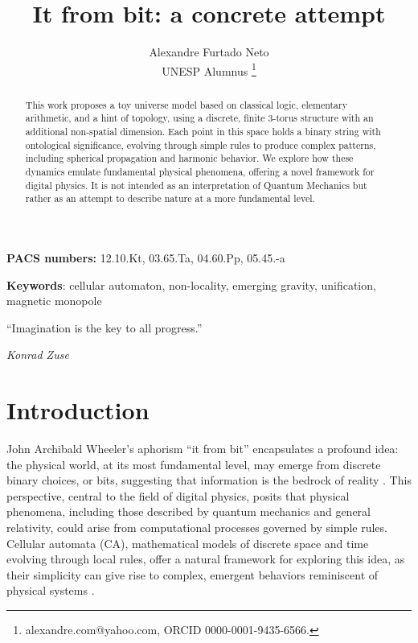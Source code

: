 \documentclass[12pt,english]{article}
\begin{document}
\title{It from bit: a concrete attempt}
\author{Alexandre Furtado Neto \\ UNESP Alumnus \thanks{alexandre.com@yahoo.com, ORCID 0000-0001-9435-6566.}}
\maketitle

\begin{abstract}
This work proposes a toy universe model based on classical logic, elementary arithmetic, and a hint of topology, using a discrete, finite 3-torus structure with an additional non-spatial dimension. Each point in this space holds a binary string with ontological significance, evolving through simple rules to produce complex patterns, including spherical propagation and harmonic behavior. We explore how these dynamics emulate fundamental physical phenomena, offering a novel framework for digital physics.  It is not intended as an interpretation of Quantum Mechanics but rather as an attempt to describe nature at a more fundamental level.

\medskip{}
\end{abstract}

\vfill

\begin{center}
\textbf{PACS numbers: }12.10.Kt, 03.65.Ta, 04.60.Pp, 05.45.-a
\par\end{center}

\begin{center}
\textbf{Keywords}: cellular automaton, non-locality, emerging gravity, unification, magnetic monopole
\par\end{center}

\newpage


\epigraph{``Imagination is the key to all progress.''}{\textit{Konrad Zuse}}

\section{Introduction}

John Archibald Wheeler's aphorism ``it from bit'' encapsulates a profound idea: the physical world, at its most fundamental level, may emerge from discrete binary choices, or bits, suggesting that information is the bedrock of reality \cite{wheeler}. This perspective, central to the field of digital physics, posits that physical phenomena, including those described by quantum mechanics and general relativity, could arise from computational processes governed by simple rules. Cellular automata (CA), mathematical models of discrete space and time evolving through local rules, offer a natural framework for exploring this idea, as their simplicity can give rise to complex, emergent behaviors reminiscent of physical systems \cite{wolfram,zuse,fredkin}.
\end{document}
